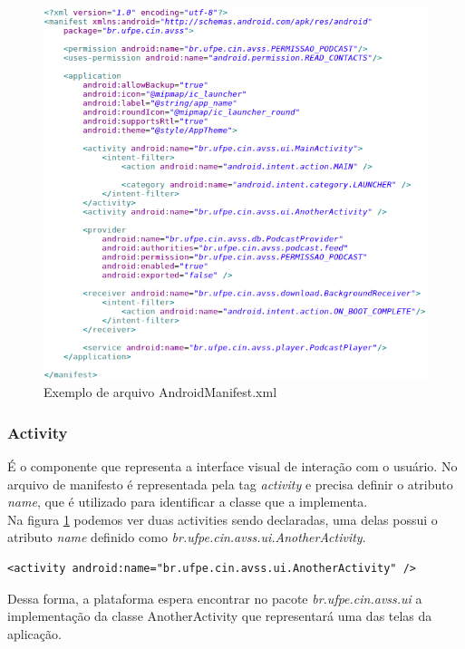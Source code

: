 \documentclass[a4paper,12pt]{article}
\begin{document}
 \begin{figure}[h]
 \centering
 \includegraphics[width=\linewidth]{imgs/manifest.png}
 \caption{Exemplo de arquivo AndroidManifest.xml}
 \label{fig:manifest}
 \end{figure}



\subsubsection{Activity}
É o componente que representa a interface visual de interação com o usuário. No arquivo de manifesto é representada pela tag \textit{activity} e precisa definir o atributo \textit{name}, que é utilizado para identificar a classe que a implementa.\\

Na figura \ref{fig:manifest} podemos ver duas activities sendo declaradas, uma delas possui o atributo \textit{name} definido como \textit{br.ufpe.cin.avss.ui.AnotherActivity}.
{\fontsize{9pt}{12pt}
\begin{Verbatim}
<activity android:name="br.ufpe.cin.avss.ui.AnotherActivity" />
\end{Verbatim}
}

Dessa forma, a plataforma espera encontrar no pacote \textit{br.ufpe.cin.avss.ui} a implementação da classe AnotherActivity que representará uma das telas da aplicação.
\end{document}
